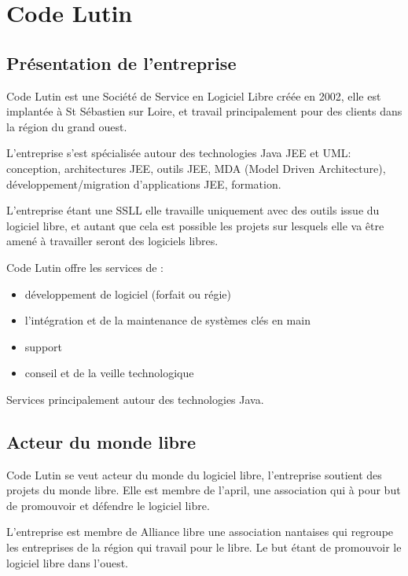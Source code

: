 \section{Code Lutin}

\subsection{Présentation de l'entreprise}


Code Lutin est une Société de Service en Logiciel Libre créée en 2002, elle est
implantée à St Sébastien sur Loire, et travail principalement pour des clients
dans la région du grand ouest.

L'entreprise s'est spécialisée autour des technologies Java JEE et UML:
conception, architectures JEE, outils JEE, MDA (Model Driven Architecture), 
développement/migration d’applications JEE, formation.

L'entreprise étant une SSLL elle travaille uniquement avec des outils issue du
logiciel libre, et autant que cela est possible les projets sur lesquels elle
va être amené à travailler seront des logiciels libres.

Code Lutin offre les services de : 
\begin{itemize}
\item développement de logiciel (forfait ou régie)
\item l’intégration et de la maintenance de systèmes clés en main
\item support
\item conseil et de la veille technologique
\end{itemize}

Services principalement autour des technologies Java.


\subsection{Acteur du monde libre}

Code Lutin se veut acteur du monde du logiciel libre, l'entreprise soutient des
projets du monde libre. Elle est membre de l'april, une association qui à pour
but de promouvoir et défendre le logiciel libre.

L'entreprise est membre de Alliance libre une association nantaises qui regroupe
les entreprises de la région qui travail pour le libre. Le but étant de
promouvoir le logiciel libre dans l'ouest.

